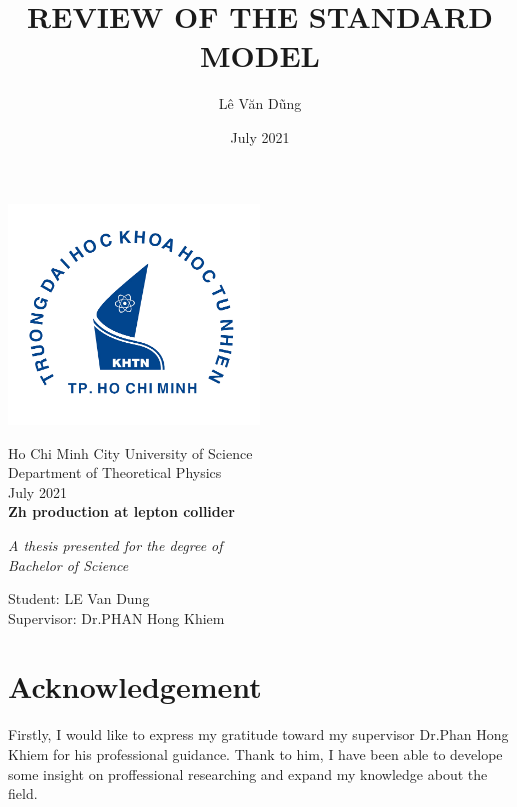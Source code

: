 \documentclass{report}
\author{Lê Văn Dũng}
\date{July 2021}
\title{REVIEW OF THE STANDARD MODEL}
\numberwithin{equation}{section}
\begin{document}
\thispagestyle{empty}
\begin{titlepage}
   \begin{center}
       \vspace*{1cm}
    \includegraphics[width=0.5\textwidth]{logo.png}\\
     \begin{huge}  
            Ho Chi Minh City University of Science\\
       Department of Theoretical Physics\\
       July 2021\\
        \vspace{1cm}
       \textbf{ Zh production at lepton collider}\\  
\end{huge}  


       \vspace{0.5cm}
            
       \vspace{1.5cm}
     	 	\begin{Large}  
            \textit{       A thesis presented for the degree of\\
       Bachelor of Science}

		\end{Large} 

       \vfill

            	 	\begin{Large}  
        Student: LE Van Dung\\
       Supervisor: Dr.PHAN Hong Khiem
		\end{Large} 
       \vspace{0.8cm}

            
   \end{center}
\end{titlepage}
\chapter*{Acknowledgement}
Firstly, I would like to express my gratitude toward my supervisor Dr.Phan Hong Khiem for his professional guidance. Thank to him, I have been able to develope some insight on proffessional researching and expand my knowledge about the field.
\end{document}
